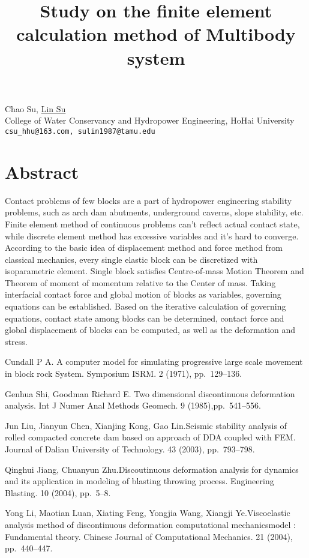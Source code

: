 \title{Study on the finite element calculation method of Multibody system}
\author{} \institute{}
\maketitle

\begin{center}
{\large Chao Su, \underline{Lin Su}}\\
College of Water Conservancy and Hydropower Engineering, HoHai University\\
{\tt csu\_hhu@163.com, sulin1987@tamu.edu}
\end{center}

\section*{Abstract}
Contact problems of few blocks are a part of hydropower engineering stability problems, such as arch dam abutments, underground caverns, slope stability, etc. Finite element method of continuous problems can't reflect actual contact state, while discrete element method has excessive variables and it's hard to converge. According to the basic idea of displacement method and force method from classical mechanics, every single elastic block can be discretized with isoparametric element. Single block satisfies Centre-of-mass Motion Theorem and Theorem of moment of momentum relative to the Center of mass. Taking interfacial contact force and global motion of blocks as variables, governing equations can be established. Based on the iterative calculation of governing equations, contact state among blocks can be determined, contact force and global displacement of blocks can be computed, as well as the deformation and stress.


\begin{thebibliography}{10}
{\sc Cundall P A}. {A computer model for simulating progressive large scale movement in block rock System}. Symposium ISRM. 2 (1971), pp.~129--136.
	
{\sc Genhua Shi, Goodman Richard E}. {Two dimensional discontinuous deformation analysis}. Int J Numer Anal Methods Geomech. 9 (1985),pp.~541--556.

{\sc Jun Liu, Jianyun Chen, Xianjing Kong, Gao Lin}.{Seismic stability analysis of rolled compacted concrete dam based on approach of DDA coupled with FEM}. Journal of Dalian University of Technology. 43 (2003), pp.~793--798.

{\sc Qinghui Jiang, Chuanyun Zhu}.{Discoutinuous deformation analysis for dynamics and its application in modeling of blasting throwing process}. Engineering Blasting. 10 (2004), pp.~5--8.

{\sc Yong Li, Maotian Luan, Xiating Feng, Yongjia Wang, Xiangji Ye}.{Viscoelastic analysis method of discontinuous deformation computational mechanicsmodel : Fundamental theory}. Chinese Journal of Computational Mechanics. 21 (2004), pp.~440--447.
\end{thebibliography}